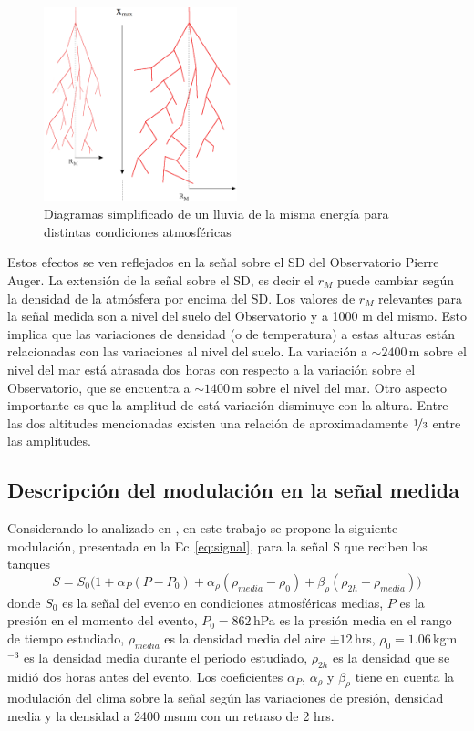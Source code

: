 \begin{figure}[H]
	\centering
	\includegraphics[width=0.5\textwidth]{eas.png}
	\caption{Diagramas simplificado de un lluvia de la misma energía para distintas condiciones atmosféricas}
	\label{fig:eas}
\end{figure}

Estos efectos se ven reflejados en la señal sobre el SD del Observatorio Pierre Auger. La extensión de la señal sobre el SD, es decir el $r_M$ puede cambiar según la densidad de la atmósfera por encima del SD. Los valores de $r_M$ relevantes para la señal medida son a nivel del suelo del Observatorio y a 1000 m del mismo. Esto implica que las variaciones de densidad (o de temperatura) a estas alturas están relacionadas con las variaciones al nivel del suelo. La variación a $\sim2400\,$m sobre el nivel del mar está atrasada dos horas con respecto a la variación sobre el Observatorio, que se encuentra a $\sim1400\,$m sobre el nivel del mar. Otro aspecto importante es que la amplitud de está variación disminuye con la altura. Entre las dos altitudes mencionadas existen una relación de aproximadamente $\nicefrac{1}{3}$ entre las amplitudes. 

\subsection{Descripción del modulación en la señal medida}

Considerando lo analizado en \cite{aab2017impact} \cite{collaboration2009atmospheric}, en este trabajo se propone la siguiente modulación, presentada en la Ec.\,\ref{eq:signal}, para la señal S que reciben los tanques 
\begin{equation}
	S=S_0\big(1+\alpha_P(P-P_0) +\alpha_{\rho}(\rho_{media}-\rho_0) + \beta_{\rho}(\rho_{2h}-\rho_{media})\big)
	\label{eq:signal}
\end{equation}
donde $S_0$ es la señal  del evento en condiciones atmosféricas medias, $P$ es la presión en el momento del evento, $P_0=862\,$hPa es la presión media en el rango de tiempo estudiado, $\rho_{media}$ es la densidad  media del aire $\pm 12\,$hrs,     $\rho_0=1.06\,$kgm$^{-3}$ es la densidad media durante el periodo estudiado, $\rho_{2h}$ es la densidad que se midió dos horas antes del evento. Los coeficientes $\alpha_P$, $\alpha_\rho$ y $\beta_\rho$ tiene en cuenta la modulación del clima sobre la señal según las variaciones de presión,  densidad media y la densidad a 2400 msnm con un retraso de 2 hrs.  

